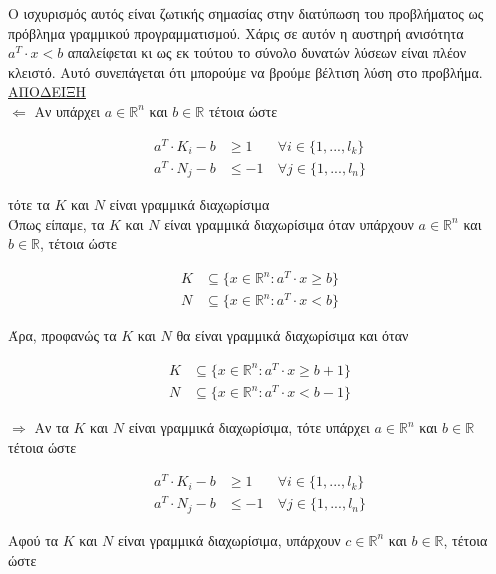 \documentclass[12pt]{article}
\newcommand{\R}{\mathbb{R}}
\begin{document}
Ο ισχυρισμός αυτός είναι ζωτικής σημασίας στην διατύπωση του προβλήματος
ως πρόβλημα γραμμικού προγραμματισμού.
Xάρις σε αυτόν η αυστηρή ανισότητα \( a^{T} \cdot x < b \) απαλείφεται
κι ως εκ τούτου το σύνολο δυνατών λύσεων είναι πλέον κλειστό. Αυτό συνεπάγεται
ότι μπορούμε να βρούμε βέλτιση λύση στο προβλήμα. \\

\underline{ΑΠΟΔΕΙΞΗ} \\

\( \Leftarrow \) Αν υπάρχει \(a \in \R^{n}\) και \(b \in \R\) τέτοια ώστε

\begin{align*}
    a^{T} \cdot K_{i} -b & \geq 1 & \forall i \in \{1,...,l_{k}\} \\
    a^{T} \cdot N_{j} - b & \leq -1\ & \forall j \in \{1,...,l_{n}\}
\end{align*}

τότε τα \( K \) και \( N \) είναι γραμμικά διαχωρίσιμα \\

Όπως είπαμε, τα \( K \) και \( N \) είναι γραμμικά διαχωρίσιμα όταν υπάρχουν \( a \in \R^{n} \) και \( b \in \R \), τέτοια ώστε

\begin{align*}
K & \subseteq \{ x \in \R^{n} : a^{T} \cdot x \geq b \} \\
N & \subseteq \{ x \in \R^{n} : a^{T} \cdot x < b\}
\end{align*}

Άρα, προφανώς τα \( K \) και \( N \) θα είναι γραμμικά διαχωρίσιμα και όταν

\begin{align*}
K & \subseteq \{ x \in \R^{n} : a^{T} \cdot x \geq b + 1 \} \\
N & \subseteq \{ x \in \R^{n} : a^{T} \cdot x < b - 1\}
\end{align*}

\( \Rightarrow \)  Αν τα \( K \) και \( N \) είναι γραμμικά διαχωρίσιμα, τότε υπάρχει \(a \in \R^{n}\) και \(b \in \R\) τέτοια ώστε

\begin{align*}
    a^{T} \cdot K_{i} -b & \geq 1 & \forall i \in \{1,...,l_{k}\} \\
    a^{T} \cdot N_{j} - b & \leq -1\ & \forall j \in \{1,...,l_{n}\}
\end{align*}

Αφού τα \( K \) και \( N \) είναι γραμμικά διαχωρίσιμα, υπάρχουν \( c \in \R^{n} \) και \( b \in \R \), τέτοια ώστε
\end{document}
